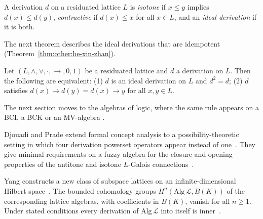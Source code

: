 \begin{definition}\label{def:other:ideal-derivation}
A derivation $d$ on a residuated lattice $L$ is \emph{isotone} if
$x \le y$ implies $d(x) \le d(y)$, \emph{contractive} if $d(x) \le x$ for
all $x \in L$, and an \emph{ideal derivation} if it is both.
\end{definition}

The next theorem describes the ideal derivations that are idempotent
(Theorem~\ref{thm:other:he-xin-zhan}).

\begin{theorem}\label{thm:other:he-xin-zhan}
Let $(L, \wedge, \vee, \cdot, \to, 0, 1)$ be a residuated lattice and $d$
a derivation on $L$. Then the following are equivalent: \textup{(1)} $d$
is an ideal derivation on $L$ and $d^{2} = d$; \textup{(2)} $d$ satisfies
$d(x) \to d(y) = d(x) \to y$ for all $x, y \in L$.
\end{theorem}

The next section moves to the algebras of logic, where the same rule
appears on a BCI, a BCK or an MV-algebra
\cite[p.~167]{JunXin2004}.

Djouadi and Prade extend formal concept analysis to a possibility-theoretic
setting in which four derivation powerset operators appear instead of one~\cite{WlPossibilityTheoreticExtensionO2011}. They
give minimal requirements on a fuzzy algebra for the closure and opening
properties of the antitone and isotone $L$-Galois
connections~\cite{WlPossibilityTheoreticExtensionO2011}.

Yang constructs a new class of subspace lattices on an infinite-dimensional
Hilbert space~\cite{WlCohomologyGroupsAndLieDerivati2025}. The bounded cohomology groups
$H^n(\mathrm{Alg}\,\mathcal{L},B(K))$ of the corresponding lattice algebras,
with coefficients in $B(K)$, vanish for all $n\geq 1$. Under stated
conditions every derivation of $\mathrm{Alg}\,\mathcal{L}$ into itself is
inner~\cite{WlCohomologyGroupsAndLieDerivati2025}.

